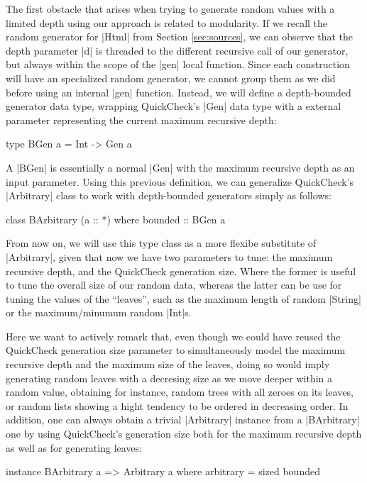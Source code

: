 The first obstacle that arises when trying to generate random values with a
limited depth using our approach is related to modularity.
%
If we recall the random generator for |Html| from Section \ref{sec:sources}, we
can observe that the depth parameter |d| is threaded to the different recursive
call of our generator, but always within the scope of the |gen| local function.
%
Since each construction will have an specialized random generator, we cannot
group them as we did before using an internal |gen| function.
%
Instead, we will define a depth-bounded generator data type, wrapping
QuickCheck's |Gen| data type with a external parameter representing the current
maximum recursive depth:

\begin{code}
type BGen a = Int -> Gen a
\end{code}

A |BGen| is essentially a normal |Gen| with the maximum recursive depth as an
input parameter.
%
Using this previous definition, we can generalize QuickCheck's |Arbitrary| class
to work with depth-bounded generators simply as follows:

\begin{code}
class BArbitrary (a :: *) where
  bounded :: BGen a
\end{code}

From now on, we will use this type class as a more flexibe substitute of
|Arbitrary|, given that now we have two parameters to tune: the maximum
recursive depth, and the QuickCheck generation size.
%
Where the former is useful to tune the overall size of our random data, whereas
the latter can be use for tuning the values of the ``leaves'', such as the
maximum length of random |String| or the maximum/minumum random |Int|s.


Here we want to actively remark that, even though we could have reused the
QuickCheck generation size parameter to simultaneously model the maximum
recursive depth and the maximum size of the leaves, doing so would imply
generating random leaves with a decresing size as we move deeper within a random
value, obtaining for instance, random trees with all zeroes on its leaves, or
random lists showing a hight tendency to be ordered in decreasing order.
%
In addition, one can always obtain a trivial |Arbitrary| instance from a
|BArbitrary| one by using QuickCheck's generation size both for the maximum
recursive depth as well as for generating leaves:

\begin{code}
instance BArbitrary a => Arbitrary a where
  arbitrary = sized bounded
\end{code} %


